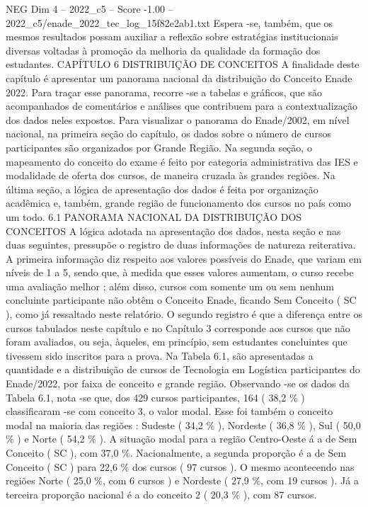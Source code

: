 \begin{textsample}{NEG Dim 4 – 2022\_c5 – Score -1.00 – 2022\_c5/enade\_2022\_tec\_log\_15f82e2ab1.txt}
Espera -se, também, que os mesmos resultados possam auxiliar a reflexão sobre estratégias institucionais diversas voltadas à promoção da melhoria da qualidade da formação dos estudantes.
CAPÍTULO 6 DISTRIBUIÇÃO DE CONCEITOS A finalidade deste capítulo é apresentar um panorama nacional da distribuição do Conceito Enade 2022.
Para traçar esse panorama, recorre -se a tabelas e gráficos, que são acompanhados de comentários e análises que contribuem para a contextualização dos dados neles expostos.
Para visualizar o panorama do Enade/2002, em nível nacional, na primeira seção do capítulo, os dados sobre o número de cursos participantes são organizados por Grande Região.
Na segunda seção, o mapeamento do conceito do exame é feito por categoria administrativa das IES e modalidade de oferta dos cursos, de maneira cruzada às grandes regiões.
Na última seção, a lógica de apresentação dos dados é feita por organização acadêmica e, também, grande região de funcionamento dos cursos no país como um todo. 6.1 PANORAMA NACIONAL DA DISTRIBUIÇÃO DOS CONCEITOS A lógica adotada na apresentação dos dados, nesta seção e nas duas seguintes, pressupõe o registro de duas informações de natureza reiterativa.
A primeira informação diz respeito aos valores possíveis do Enade, que variam em níveis de 1 a 5, sendo que, à medida que esses valores aumentam, o curso recebe uma avaliação melhor ; além disso, cursos com somente um ou sem nenhum concluinte participante não obtêm o Conceito Enade, ficando Sem Conceito ( SC ), como já ressaltado neste relatório.
O segundo registro é que a diferença entre os cursos tabulados neste capítulo e no Capítulo 3 corresponde aos cursos que não foram avaliados, ou seja, àqueles, em princípio, sem estudantes concluintes que tivessem sido inscritos para a prova.
Na Tabela 6.1, são apresentadas a quantidade e a distribuição de cursos de Tecnologia em Logística participantes do Enade/2022, por faixa de conceito e grande região.
Observando -se os dados da Tabela 6.1, nota -se que, dos 429 cursos participantes, 164 ( 38,2 \% ) classificaram -se com conceito 3, o valor modal.
Esse foi também o conceito modal na maioria das regiões : Sudeste ( 34,2 \% ), Nordeste ( 36,8 \% ), Sul ( 50,0 \% ) e Norte ( 54,2 \% ).
A situação modal para a região Centro-Oeste á a de Sem Conceito ( SC ), com 37,0 \%.
Nacionalmente, a segunda proporção é a de Sem Conceito ( SC ) para 22,6 \% dos cursos ( 97 cursos ).
O mesmo acontecendo nas regiões Norte ( 25,0 \%, com 6 cursos ) e Nordeste ( 27,9 \%, com 19 cursos ).
Já a terceira proporção nacional é a do conceito 2 ( 20,3 \% ), com 87 cursos.

\end{textsample}
